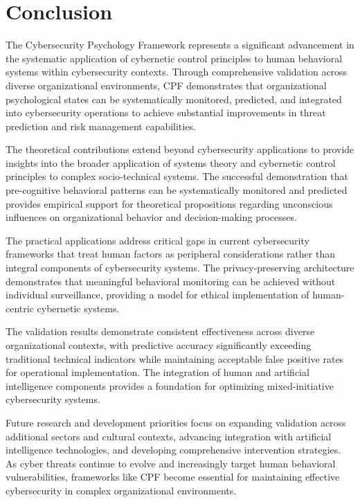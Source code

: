 \documentclass[journal]{IEEEtran}
\begin{document}
\section{Conclusion}

The Cybersecurity Psychology Framework represents a significant advancement in the systematic application of cybernetic control principles to human behavioral systems within cybersecurity contexts. Through comprehensive validation across diverse organizational environments, CPF demonstrates that organizational psychological states can be systematically monitored, predicted, and integrated into cybersecurity operations to achieve substantial improvements in threat prediction and risk management capabilities.

The theoretical contributions extend beyond cybersecurity applications to provide insights into the broader application of systems theory and cybernetic control principles to complex socio-technical systems. The successful demonstration that pre-cognitive behavioral patterns can be systematically monitored and predicted provides empirical support for theoretical propositions regarding unconscious influences on organizational behavior and decision-making processes.

The practical applications address critical gaps in current cybersecurity frameworks that treat human factors as peripheral considerations rather than integral components of cybersecurity systems. The privacy-preserving architecture demonstrates that meaningful behavioral monitoring can be achieved without individual surveillance, providing a model for ethical implementation of human-centric cybernetic systems.

The validation results demonstrate consistent effectiveness across diverse organizational contexts, with predictive accuracy significantly exceeding traditional technical indicators while maintaining acceptable false positive rates for operational implementation. The integration of human and artificial intelligence components provides a foundation for optimizing mixed-initiative cybersecurity systems.

Future research and development priorities focus on expanding validation across additional sectors and cultural contexts, advancing integration with artificial intelligence technologies, and developing comprehensive intervention strategies. As cyber threats continue to evolve and increasingly target human behavioral vulnerabilities, frameworks like CPF become essential for maintaining effective cybersecurity in complex organizational environments.
\end{document}
